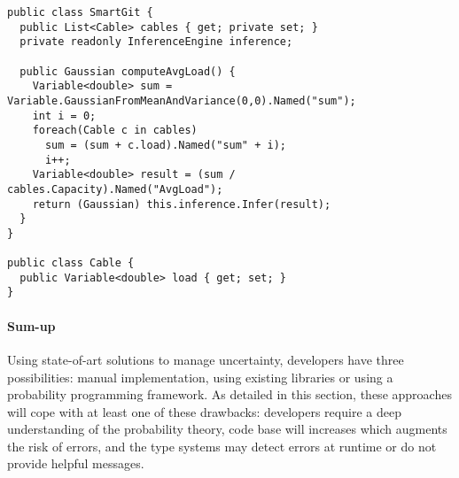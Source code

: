 \begin{lstlisting}[style=cSharpStyle, caption=Limitation using a probability programing framework (C\#), label=lst:limit-proba-prog-fw, linewidth=0.97\textwidth]
public class SmartGit {
  public List<Cable> cables { get; private set; }
  private readonly InferenceEngine inference;

  public Gaussian computeAvgLoad() {
    Variable<double> sum = Variable.GaussianFromMeanAndVariance(0,0).Named("sum");
    int i = 0;
    foreach(Cable c in cables)
      sum = (sum + c.load).Named("sum" + i);
      i++;
    Variable<double> result = (sum / cables.Capacity).Named("AvgLoad");
    return (Gaussian) this.inference.Infer(result);
  }
}

public class Cable {
  public Variable<double> load { get; set; }
}
\end{lstlisting}

\paragraph{Sum-up}
Using state-of-art solutions to manage uncertainty, developers have three possibilities: manual implementation, using existing libraries or using a probability programming framework.
As detailed in this section, these approaches will cope with at least one of these drawbacks: developers require a deep understanding of the probability theory, code base will increases which augments the risk of errors, and the type systems may detect errors at runtime or do not provide helpful messages.


